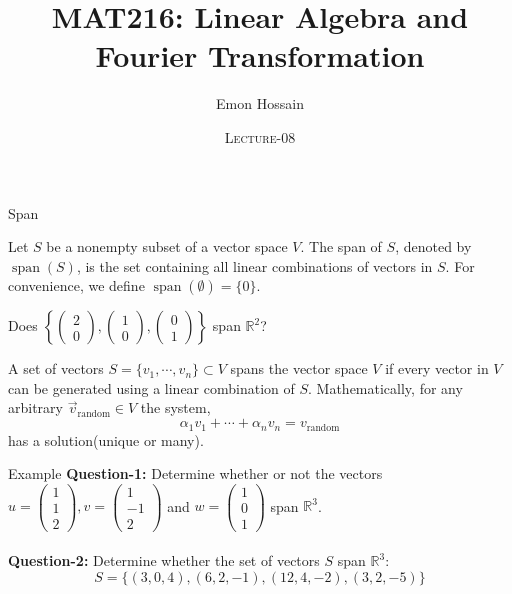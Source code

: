 \documentclass[11pt]{beamer}
\author[] %
{Emon Hossain\inst{1}}
\institute[University of Dhaka] %
{
  \inst{1}%
  Lecturer\\MNS department\\Brac University
}
\date[] %
{\textsc{Lecture-08}}
\title[]{MAT216: Linear Algebra and Fourier Transformation}
\theoremstyle{plain}
\begin{document}
\begin{frame}
\titlepage
\end{frame}

\begin{frame}{Span}
    \begin{definition}
    Let $S$ be a nonempty subset of a vector space $V$. The span of $S$, denoted by $\operatorname{span}(S)$, is the set containing all linear combinations of vectors in $S$. For convenience, we define $\operatorname{span}(\emptyset)=\{0\}$.
\end{definition}
\begin{example}
    Does $\left\{\begin{pmatrix}2\\0\end{pmatrix}, \begin{pmatrix}1\\0\end{pmatrix}, \begin{pmatrix}0\\1\end{pmatrix}\right\}$ span $\mathbb R^2$?
\end{example}
A set of vectors $S=\{v_1,\cdots,v_n\}\subset V$ spans the vector space $V$ if every vector in $V$ can be generated using a linear combination of $S$. Mathematically, for any arbitrary $\vec v_{\text{random}}\in V$ the system, $$\alpha_1 v_1+\cdots+\alpha_n v_n=v_{\text{random}}$$
has a solution(unique or many).
\end{frame}

\begin{frame}{Example}
    \textbf{Question-1:} Determine whether or not the vectors $u=\begin{pmatrix}
        1\\1\\2
    \end{pmatrix},v=\begin{pmatrix}
        1\\-1\\2
    \end{pmatrix}$ and $w=\begin{pmatrix}
        1\\0\\1
    \end{pmatrix}$ span $\mathbb R^3$.\\~\\
    \textbf{Question-2:} Determine whether the set of vectors $S$ span $\mathbb R^3$:
    $$S=\{(3,0,4),(6,2,-1),(12,4,-2),(3,2,-5)\}$$
\end{frame}
\end{document}
